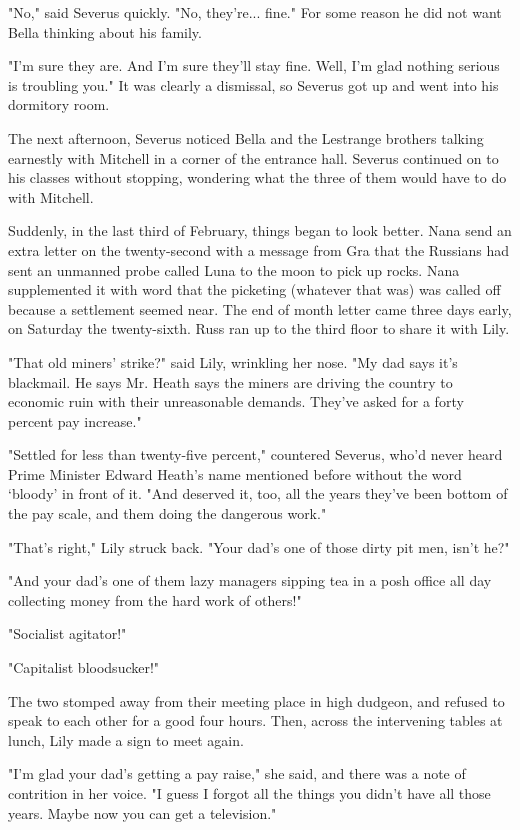 \documentclass[a4paper,11pt]{article}
\begin{document}
"No," said Severus quickly. "No, they're... fine." For some reason he did not want Bella thinking about his family.

"I'm sure they are. And I'm sure they'll stay fine. Well, I'm glad nothing serious is troubling you." It was clearly a dismissal, so Severus got up and went into his dormitory room.

The next afternoon, Severus noticed Bella and the Lestrange brothers talking earnestly with Mitchell in a corner of the entrance hall. Severus continued on to his classes without stopping, wondering what the three of them would have to do with Mitchell.

Suddenly, in the last third of February, things began to look better. Nana send an extra letter on the twenty-second with a message from Gra that the Russians had sent an unmanned probe called Luna to the moon to pick up rocks. Nana supplemented it with word that the picketing (whatever that was) was called off because a settlement seemed near. The end of month letter came three days early, on Saturday the twenty-sixth. Russ ran up to the third floor to share it with Lily.

"That old miners' strike?" said Lily, wrinkling her nose. "My dad says it's blackmail. He says Mr. Heath says the miners are driving the country to economic ruin with their unreasonable demands. They've asked for a forty percent pay increase."

"Settled for less than twenty-five percent," countered Severus, who'd never heard Prime Minister Edward Heath's name mentioned before without the word `bloody' in front of it. "And deserved it, too, all the years they've been bottom of the pay scale, and them doing the dangerous work."

"That's right," Lily struck back. "Your dad's one of those dirty pit men, isn't he?"

"And your dad's one of them lazy managers sipping tea in a posh office all day collecting money from the hard work of others!"

"Socialist agitator!"

"Capitalist bloodsucker!"

The two stomped away from their meeting place in high dudgeon, and refused to speak to each other for a good four hours. Then, across the intervening tables at lunch, Lily made a sign to meet again.

"I'm glad your dad's getting a pay raise," she said, and there was a note of contrition in her voice. "I guess I forgot all the things you didn't have all those years. Maybe now you can get a television."
\end{document}
